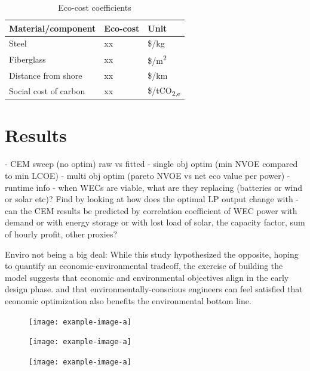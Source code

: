 \documentclass[10pt,twoside]{article}
\begin{document}
\begin{table}[H]
    \begin{center}
    \begin{tabular}{ lll } 
     \hline
     Material/component & Eco-cost & Unit \\ 
     \hline
     Steel & xx & \$/kg \\ 
     Fiberglass & xx & \$/m\textsuperscript{2} \\ 
     Distance from shore & xx & \$/km \\ 
     Social cost of carbon & xx & \$/tCO\textsubscript{2,e} \\
    \end{tabular}
    \caption{Eco-cost coefficients}
    \label{tab:lca-weights}
    \end{center}
\end{table}


\section{Results}
    -  CEM sweep (no optim) raw vs fitted
    -  single obj optim (min NVOE compared to min LCOE)
    -  multi obj optim (pareto NVOE vs net eco value per power)
    -  runtime info
    -  when WECs are viable, what are they replacing (batteries or wind or solar etc)? Find by looking at how does the optimal LP output change with
    -  can the CEM results be predicted by correlation coefficient of WEC power with demand or with energy storage or with lost load of solar, the capacity factor, sum of hourly profit, other proxies?

    Enviro not being a big deal: While this study hypothesized the opposite, hoping to quantify an economic-environmental tradeoff, the exercise of building the model suggests that economic and environmental objectives align in the early design phase.
and that environmentally-conscious engineers can feel satisfied that economic optimization also benefits the environmental bottom line.

\begin{figure}[b]
\noindent
\begin{minipage}[t]{0.32\textwidth}
    \centering
    \texttt{[image: example-image-a]}
    \label{fig:cem-results}
\end{minipage}
\hfill
\begin{minipage}[t]{0.32\textwidth}
    \centering
    \texttt{[image: example-image-a]}
    \label{fig:single-obj-compare}
\end{minipage}
\hfill
\begin{minipage}[t]{0.32\textwidth}
    \centering
    \texttt{[image: example-image-a]}
    \label{fig:pareto}
\end{minipage}
\end{figure}
\end{document}
